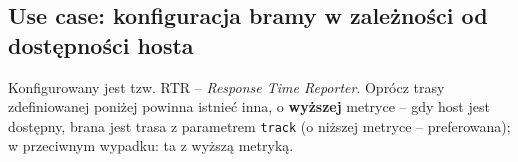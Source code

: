 \subsection{Use case: konfiguracja bramy w zależności od dostępności hosta}
Konfigurowany jest tzw. RTR -- \textit{Response Time Reporter}. Oprócz trasy zdefiniowanej poniżej powinna istnieć inna, o \textbf{wyższej} metryce -- gdy host jest dostępny, brana jest trasa z parametrem \texttt{track} (o niższej metryce -- preferowana); w przeciwnym wypadku: ta z wyższą metryką.
